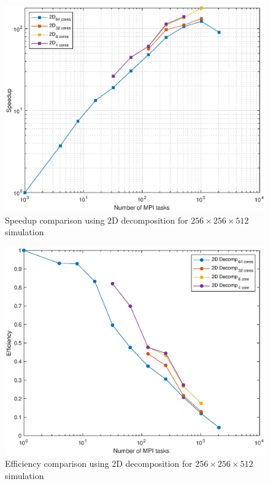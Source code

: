 \begin{figure}
\begin{center}
\includegraphics[scale=0.55]{grafici/1287}
\caption{Speedup comparison using 2D decomposition for $256\times 256\times 512$  simulation}
\label{1287}
\end{center}
\end{figure}

\begin{figure}
\begin{center}
\includegraphics[scale=0.55]{grafici/1289}
\caption{Efficiency comparison using 2D decomposition for $256\times 256\times 512$  simulation}
\label{1289}
\end{center}
\end{figure}

